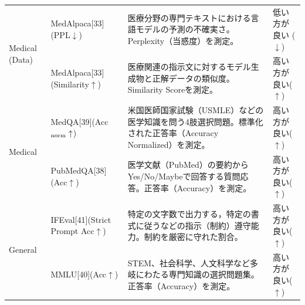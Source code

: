 \begin{table}[htbp]
\begin{tabularx}{\textwidth}{p{2.0cm}p{3.3cm}Xp{2.2cm}}
\midrule
\multirow{2}{*}{Medical (Data)}
& MedAlpaca[33](PPL$\downarrow$) & 医療分野の専門テキストにおける言語モデルの予測の不確実さ。Perplexity（当惑度）を測定。 & 低い方が良い ($\downarrow$) \\
& MedAlpaca[33](Similarity$\uparrow$) & 医療関連の指示文に対するモデル生成物と正解データの類似度。Similarity Scoreを測定。 & 高い方が良い($\uparrow$) \\
\midrule
\multirow{2}{*}{Medical}
& MedQA[39](Acc$_{\rm norm}\uparrow$) & 米国医師国家試験（USMLE）などの医学知識を問う4肢選択問題。標準化された正答率（Accuracy Normalized）を測定。 & 高い方が良い($\uparrow$) \\
& PubMedQA[38](Acc$\uparrow$) & 医学文献（PubMed）の要約からYes/No/Maybeで回答する質問応答。正答率（Accuracy）を測定。 & 高い方が良い($\uparrow$) \\
\midrule
\multirow{2}{*}{General}
& IFEval[41](Strict Prompt Acc$\uparrow$) & 特定の文字数で出力する，特定の書式に従うなどの指示（制約）遵守能力。制約を厳密に守れた割合。 & 高い方が良い($\uparrow$) \\
& MMLU[40](Acc$\uparrow$) & STEM、社会科学、人文科学など多岐にわたる専門知識の選択問題集。正答率（Accuracy）を測定。 & 高い方が良い($\uparrow$) \\
\bottomrule
\end{tabularx}
\end{table}


